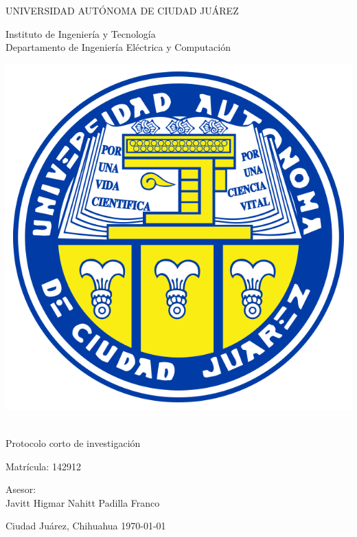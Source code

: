 \thispagestyle{empty}

\begin{center} \vfill

{\Large UNIVERSIDAD AUTÓNOMA DE CIUDAD JUÁREZ}\\
\vspace{6mm}
{\large Instituto de Ingeniería y Tecnología\\
\vspace{6mm}
Departamento de Ingeniería Eléctrica y Computación
\vspace{20mm}

\includegraphics [scale=0.7]{images/escudo-uacj.png}
\vspace{10mm}

\thetitle\\

\vspace{15mm}
Protocolo corto de investigación\\
\vspace{5mm}

\theauthor\hspace{10mm} Matrícula: 142912\\
\vspace{15mm}

Asesor:\\
Javitt Higmar Nahitt Padilla Franco
\\
\vspace{10mm}

} \vfill
	Ciudad Juárez, Chihuahua \hspace{30mm}\today


\end{center}
